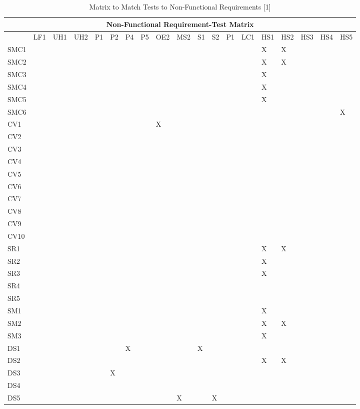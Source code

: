 \documentclass[11pt]{article}
\begin{document}
\begin{table}[H]
\centering
\caption{Matrix to Match Tests to Non-Functional Requirements [1]}
\label{my-label}
\begin{tabular}{| l | l | l | l | l | l | l | l | l | l | l | l | l | l | l | l | l | l | l |}
\hline
\multicolumn{19}{|c|}{\textbf{Non-Functional Requirement-Test Matrix}}                          \\ \hline
 & \tiny{LF1} & \tiny{UH1} & \tiny{UH2} & \tiny{P1} & \tiny{P2} & \tiny{P4} & \tiny{P5} & \tiny{OE2} & \tiny{MS2} & \tiny{S1} & \tiny{S2} & \tiny{P1} & \tiny{LC1} & \tiny{HS1} & \tiny{HS2} & \tiny{HS3} & \tiny{HS4} & \tiny{HS5} \\ \hline
SMC1&&&&&&&&&&&&&&X&X&&& \\ \hline
SMC2&&&&&&&&&&&&&&X&X&&& \\ \hline
SMC3&&&&&&&&&&&&&&X&&&& \\ \hline
SMC4&&&&&&&&&&&&&&X&&&& \\ \hline
SMC5&&&&&&&&&&&&&&X&&&& \\ \hline
SMC6&&&&&&&&&&&&&&&&&&X \\ \hline
CV1&&&&&&&&X&&&&&&&&&& \\ \hline
CV2&&&&&&&&&&&&&&&&&& \\ \hline
CV3&&&&&&&&&&&&&&&&&& \\ \hline
CV4&&&&&&&&&&&&&&&&&& \\ \hline
CV5&&&&&&&&&&&&&&&&&& \\ \hline
CV6&&&&&&&&&&&&&&&&&& \\ \hline
CV7&&&&&&&&&&&&&&&&&& \\ \hline
CV8&&&&&&&&&&&&&&&&&& \\ \hline
CV9&&&&&&&&&&&&&&&&&& \\ \hline
CV10&&&&&&&&&&&&&&&&&& \\ \hline
SR1&&&&&&&&&&&&&&X&X&&& \\ \hline
SR2&&&&&&&&&&&&&&X&&&& \\ \hline
SR3&&&&&&&&&&&&&&X&&&& \\ \hline
SR4&&&&&&&&&&&&&&&&&& \\ \hline
SR5&&&&&&&&&&&&&&&&&& \\ \hline
SM1&&&&&&&&&&&&&&X&&&& \\ \hline
SM2&&&&&&&&&&&&&&X&X&&& \\ \hline
SM3&&&&&&&&&&&&&&X&&&& \\ \hline
DS1&&&&&&X&&&&X&&&&&&&& \\ \hline
DS2&&&&&&&&&&&&&&X&X&&& \\ \hline
DS3&&&&&X&&&&&&&&&&&&& \\ \hline
DS4&&&&&&&&&&&&&&&&&& \\ \hline
DS5&&&&&&&&&X&&X&&&&&&& \\ \hline
\end{tabular}
\end{table}
\end{document}
